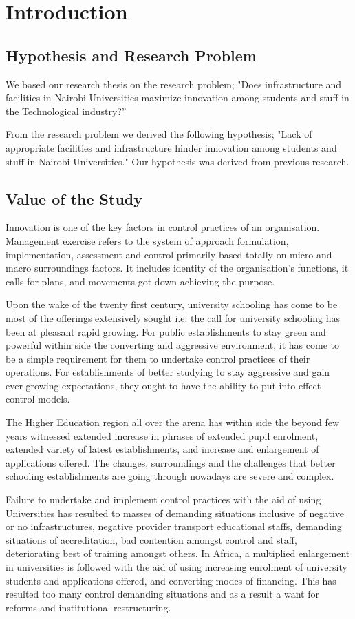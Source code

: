 \chapter{\huge{\textbf{Introduction}}}

\section{\textbf{Hypothesis and Research Problem}}
We based our research thesis on the research problem; "Does infrastructure and facilities in Nairobi Universities maximize innovation among students and stuff in the Technological industry?”

From the research problem we derived the following hypothesis; "Lack of appropriate facilities and infrastructure hinder innovation among students and stuff in Nairobi Universities." Our hypothesis was derived from previous research.

\section{\textbf{Value of the Study}}
Innovation is one of the key factors in control practices of an organisation. Management exercise refers to the system of approach formulation, implementation, assessment and control primarily based totally on micro and macro surroundings factors. It includes identity of the organisation's functions, it calls for plans, and movements got down achieving the purpose.

Upon the wake of the twenty first century, university schooling has come to be most of the offerings extensively sought i.e. the call for university schooling has been at pleasant rapid growing. For public establishments to stay green and powerful within side the converting and aggressive environment, it has come to be a simple requirement for them to undertake control practices of their operations. For establishments of better studying to stay aggressive and gain ever-growing expectations, they ought to have the ability to put into effect control models.

The Higher Education region all over the arena has within side the beyond few years witnessed extended increase in phrases of extended pupil enrolment, extended variety of latest establishments, and increase and enlargement of applications offered. The changes, surroundings and the challenges that better schooling establishments are going through nowadays are severe and complex.

Failure to undertake and implement control practices with the aid of using Universities has resulted to masses of demanding situations inclusive of negative or no infrastructures, negative provider transport educational staffs, demanding situations of accreditation, bad contention amongst control and staff, deteriorating best of training amongst others. In Africa, a multiplied enlargement in universities is followed with the aid of using increasing enrolment of university students and applications offered, and converting modes of financing. This has resulted too many control demanding situations and as a result a want for reforms and institutional restructuring.

